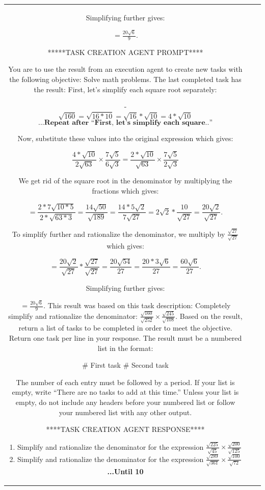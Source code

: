 \begin{table}[h!]
\begin{tabular}{c|c|p{11cm}}
Simplifying further gives:

$= \frac{20\sqrt{6}}{9}.$

*****TASK CREATION AGENT PROMPT****

You are to use the result from an execution agent to create new tasks with the following objective: Solve math problems.
The last completed task has the result: 
First, let's simplify each square root separately:

- $$\sqrt{160} = \sqrt{16*10} = \sqrt{16}*\sqrt{10} = 4*\sqrt{10}$$ 
$$\textbf{...Repeat after ``First, let’s simplify each square..''}$$

Now, substitute these values into the original expression which gives:

$$ \frac{4*\sqrt{10}}{2\sqrt{63}}\times\frac{7\sqrt{5}}{6\sqrt{3}} = \frac{2*\sqrt{10}}{\sqrt{63}} \times \frac{7\sqrt{5}}{2\sqrt{3}}$$

We get rid of the square root in the denominator by multiplying the fractions which gives:

$$= \frac{2*7\sqrt{10*5}}{2*\sqrt{63*3}} =  \frac{14\sqrt{50}}{\sqrt{189}}
= \frac{14*5\sqrt{2}}{7\sqrt{27}} = 2\sqrt{2}*\frac{10}{\sqrt{27}} = \frac{20\sqrt{2}}{\sqrt{27}}.$$

To simplify further and rationalize the denominator, we multiply by $\frac{\sqrt{27}}{\sqrt{27}}$ which gives:

$$= \frac{20\sqrt{2}}{\sqrt{27}} * \frac{\sqrt{27}}{\sqrt{27}}
=  \frac{20\sqrt{54}}{27} = \frac{20*3\sqrt{6}}{27}= \frac{60\sqrt{6}}{27}.$$ 

Simplifying further gives:

$= \frac{20\sqrt{6}}{9}.$
This result was based on this task description: Completely simplify and rationalize the denominator: $\frac{\sqrt{160}}{\sqrt{252}}\times\frac{\sqrt{245}}{\sqrt{108}}$.
Based on the result, return a list of tasks to be completed in order to meet the objective. 
Return one task per line in your response. The result must be a numbered list in the format:

\# First task
\# Second task

The number of each entry must be followed by a period. If your list is empty, write ``There are no tasks to add at this time.''
Unless your list is empty, do not include any headers before your numbered list or follow your numbered list with any other output.


****TASK CREATION AGENT RESPONSE****

1. Simplify and rationalize the denominator for the expression $\frac{\sqrt{225}}{\sqrt{45}}\times\frac{\sqrt{200}}{\sqrt{125}}$
2. Simplify and rationalize the denominator for the expression $\frac{\sqrt{289}}{\sqrt{361}}\times\frac{\sqrt{100}}{\sqrt{72}}$
\textbf{...Until 10}


\end{tabular}
\end{table}
